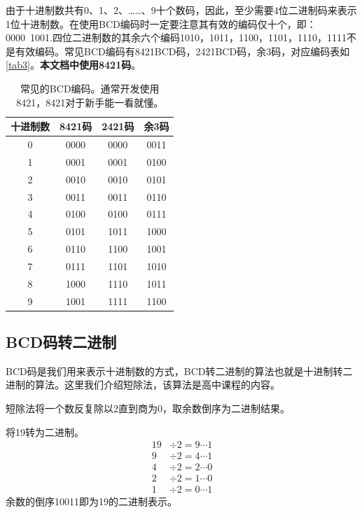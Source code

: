 由于十进制数共有0、1、2、……、9十个数码，因此，至少需要4位二进制码来表示1位十进制数。在使用BCD编码时一定要注意其有效的编码仅十个，即：0000~1001.四位二进制数的其余六个编码1010，1011，1100，1101，1110，1111不是有效编码。常见BCD编码有8421BCD码，2421BCD码，余3码，对应编码表如\autoref{tab3}。\textbf{本文档中使用8421码}。
\begin{table}[!ht]
\centering
\begin{tabular}{|c|c|c|c|}
\hline
十进制数&8421码&2421码&余3码\\\hline
0&0000&0000&0011\\\hline
1&0001&0001&0100\\\hline
2&0010&0010&0101\\\hline
3&0011&0011&0110\\\hline
4&0100&0100&0111\\\hline
5&0101&1011&1000\\\hline
6&0110&1100&1001\\\hline
7&0111&1101&1010\\\hline
8&1000&1110&1011\\\hline
9&1001&1111&1100\\\hline
\end{tabular}
\caption{常见的BCD编码。通常开发使用8421，8421对于新手能一看就懂。}\label{tab3}
\end{table}

\subsection{BCD码转二进制}
BCD码是我们用来表示十进制数的方式，BCD转二进制的算法也就是十进制转二进制的算法。这里我们介绍短除法，该算法是高中课程的内容。

短除法将一个数反复除以2直到商为0，取余数倒序为二进制结果。
\begin{example}
将19转为二进制。
\begin{align*}
19&\div2=9\cdots1\\
9&\div2=4\cdots1\\
4&\div2=2\cdots0\\
2&\div2=1\cdots0\\
1&\div2=0\cdots1
\end{align*}
余数的倒序10011即为19的二进制表示。
\end{example}

